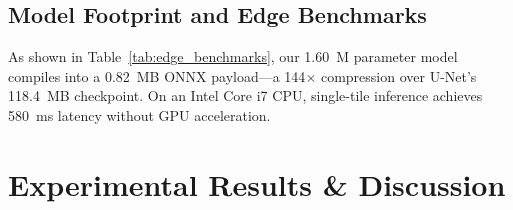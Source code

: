 \documentclass[conference]{IEEEtran}
\begin{document}
\subsection{Model Footprint and Edge Benchmarks}
As shown in Table~\ref{tab:edge_benchmarks}, our 1.60~M parameter model compiles into a 0.82~MB ONNX payload—a 144$\times$ compression over U-Net's 118.4~MB checkpoint. On an Intel Core i7 CPU, single-tile inference achieves 580~ms latency without GPU acceleration.

\begin{table}[t]
\centering
\caption{Edge Model Footprint, Storage, and Inference Latency Benchmarks (Input: $1\times3\times256\times256$)}
\label{tab:edge_benchmarks}
\end{table}

\section{Experimental Results \& Discussion}
\label{sec:experiments}
\end{document}
